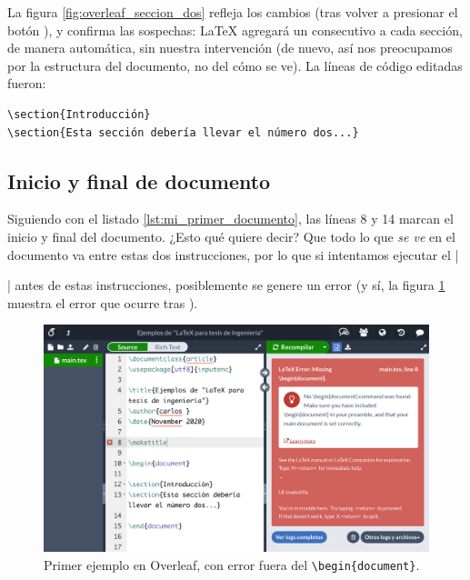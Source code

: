 La figura \ref{fig:overleaf_seccion_dos} refleja los cambios (tras volver a presionar el botón ), y confirma las sospechas: \LaTeX{} agregará un consecutivo a cada sección, de manera automática, sin nuestra intervención (de nuevo, así nos preocupamos por la estructura del documento, no del cómo se ve). La líneas de código editadas fueron:

\begin{lstlisting}[style=latex]
\section{Introducción}
\section{Esta sección debería llevar el número dos...}
\end{lstlisting}



\subsection{Inicio y final de documento}
\label{sub:inicio_y_final_de_documento}



Siguiendo con el listado \ref{lst:mi_primer_documento}, las líneas 8 y 14 marcan el inicio y final del documento. ¿Esto qué quiere decir? Que todo lo que \emph{se ve} en el documento va entre estas dos instrucciones, por lo que si intentamos ejecutar el |\maketitle| antes de estas instrucciones, posiblemente se genere un error (y sí, la figura \ref{fig:overleaf_error_fuera_de_document} muestra el error que ocurre tras ).

\begin{figure}[ht!]
	\centering
	\includegraphics[width=\linewidth]{img/overleaf_error_fuera_de_document_300ppi.png}
	\caption{Primer ejemplo en Overleaf, con error fuera del \texttt{\textbackslash{}begin\{document\}}.}
	\label{fig:overleaf_error_fuera_de_document}
\end{figure}

